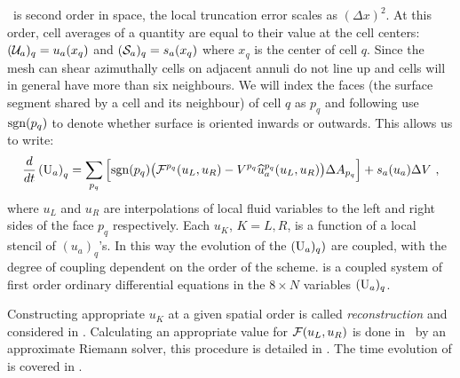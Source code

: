 \grdisco\ is second order in space, the local truncation error scales as $(\Delta x)^2$.  At this order, cell averages of a quantity are equal to their value at the cell centers: $(\mathcal{U}_a)_q = u_a(x_q)$ and $(\mathcal{S}_a)_q = s_a(x_q)$ where $x_q$ is the center of cell $q$.  Since the mesh can shear azimuthally cells on adjacent annuli do not line up and cells will in general have more than six neighbours.  We will index the faces (the surface segment shared by a cell and its neighbour) of cell $q$ as $p_q$ and following  use $\mathrm{sgn}(p_q)$ to denote whether surface is oriented inwards or outwards.  This allows us to write:
\begin{equation}
	\frac{d}{dt} \left(\UUU_a\right)_q = \sum_{p_q} \Big[\sgn(p_q)\big(\FF^{p_q}(u_L,u_R) - V^{p_q} \widehat u_a^{p_q}(u_L,u_R)\big)\Delta A_{p_q}\Big] + s_a(u_a) \Delta V\ , \eqlabel{numFVform}
\end{equation}
where $u_L$ and $u_R$ are interpolations of local fluid variables to the left and right sides of the face $p_q$ respectively.  Each $u_K$, $K=L,R$, is a function of a local stencil of $(u_a)_q$'s.  In this way the evolution of the $(\mathrm{U}_a)_q)$ are coupled, with the degree of coupling dependent on the order of the scheme.   is a coupled system of first order ordinary differential equations in the $8\times N$ variables $(\mathrm{U}_a)_q$.

Constructing appropriate $u_K$ at a given spatial order is called \emph{reconstruction} and considered in .  Calculating an appropriate value for $\mathcal{F}(u_L, u_R)$ is done in \grdisco\ by an approximate Riemann solver, this procedure is detailed in .  The time evolution of  is covered in .

